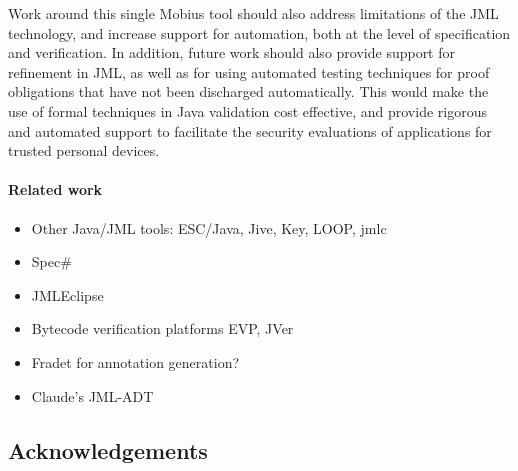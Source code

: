 Work around this single \textsf{Mobius} tool should also address
limitations of the JML technology, and increase support for
automation, both at the level of specification and verification. In
addition, future work should also provide support for refinement in
JML, as well as for using automated testing techniques for proof
obligations that have not been discharged automatically. This would
make the use of formal techniques in Java validation cost effective,
and provide rigorous and automated support to facilitate the security
evaluations of applications for trusted personal devices.

\paragraph{Related work}
\begin{itemize}
\item Other Java/JML tools: ESC/Java, Jive, Key, LOOP, jmlc
\item Spec\#
\item JMLEclipse
\item Bytecode verification platforms EVP, JVer
\item Fradet for annotation generation?
\item Claude's JML-ADT
\end{itemize}


\subsection*{Acknowledgements}
